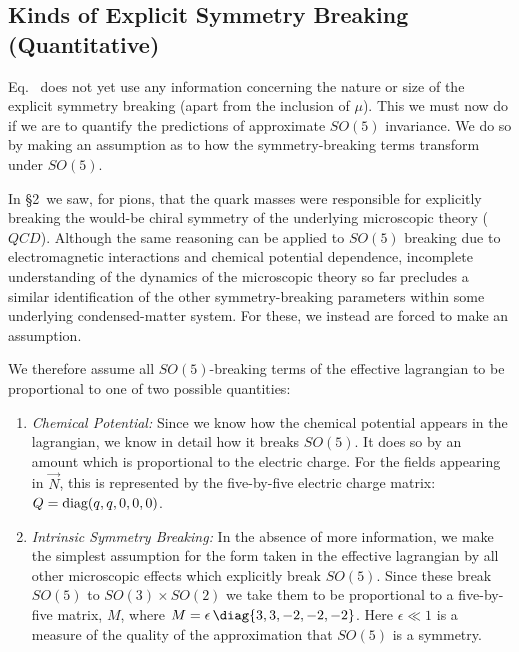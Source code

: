 \documentclass[12pt,epsf]{report}
\begin{document}
\subsection{Kinds of Explicit Symmetry Breaking
(Quantitative)}

Eq.~ does not yet use any information
concerning the nature or size of the explicit symmetry
breaking (apart from the inclusion of $\mu$). This we must
now do if we are to quantify the predictions of approximate
$SO(5)$ invariance. We do so by making an assumption as to
how the symmetry-breaking  terms transform under $SO(5)$.

In \S2\ we saw, for pions, that the quark masses were
responsible for explicitly breaking the would-be chiral
symmetry of the underlying microscopic theory ($QCD$).
Although the same reasoning can be applied to $SO(5)$
breaking due to electromagnetic interactions and chemical
potential dependence, incomplete understanding of the
dynamics of the microscopic theory so far precludes a
similar identification of the other symmetry-breaking
parameters within some underlying condensed-matter system.
For these, we instead are forced to make an assumption.

We therefore assume all $SO(5)$-breaking terms of the
effective lagrangian to be proportional to one of two
possible quantities:

\begin{enumerate}

\item
{\it Chemical Potential:}
Since we know how the chemical potential appears in the
lagrangian, we know in detail how it breaks $SO(5)$. It
does so by an amount which is proportional to the electric
charge. For the fields appearing in $\vec{N}$, this is
represented by the five-by-five electric charge matrix: $Q
= \hbox{diag}(q,q,0,0,0)$.

\item
{\it Intrinsic Symmetry Breaking:}
In the absence of more information, we make the simplest
assumption for the form taken in the effective lagrangian
by all other microscopic effects which explicitly break
$SO(5)$. Since these break $SO(5)$ to $SO(3)\times SO(2)$
we take them to be proportional to a five-by-five matrix,
$M$, where $M = \epsilon 
\,\diag{3,3,-2,-2,-2}$. Here $\epsilon \ll 1$ is a measure
of the quality of the approximation that $SO(5)$ is a
symmetry.

\end{enumerate}
\end{document}
